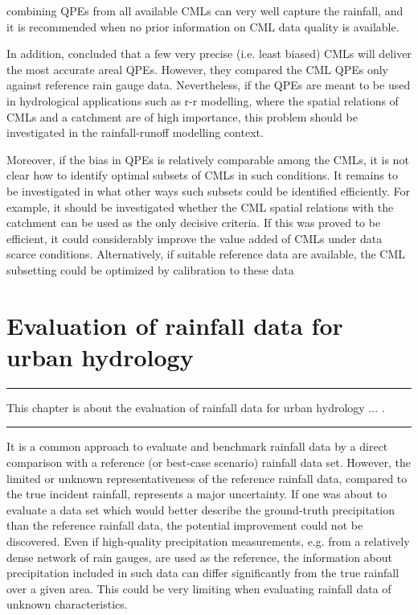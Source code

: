 \documentclass{ctuthesis}\usepackage[]{graphicx}\usepackage[]{color}
\begin{document}
combining QPEs from all available CMLs can very well capture the rainfall, and it is recommended when no prior information on CML data quality is available.

In addition, \cite{fenclCommercialMicrowaveLinks2015} concluded that a few very precise (i.e. least biased) CMLs will deliver the most accurate areal QPEs. However, they compared the CML QPEs only against reference rain gauge data. Nevertheless, if the QPEs are meant to be used in hydrological applications such as r-r modelling, where the spatial relations of CMLs and a catchment are of high importance, this problem should be investigated in the rainfall-runoff modelling context.

Moreover, if the bias in QPEs is relatively comparable among the CMLs, it is not clear how to identify optimal subsets of CMLs in such conditions. It remains to be investigated in what other ways such subsets could be identified efficiently. 
For example, it should be investigated whether the CML spatial relations with the catchment can be used as the only decisive criteria. If this was proved to be efficient, it could considerably improve the value added of CMLs under data scarce conditions.
Alternatively, if suitable reference data are available, the CML subsetting could be optimized by calibration to these data

        


\chapter{Evaluation of rainfall data for urban hydrology} \label{chap2_5}

\rule{\textwidth}{0.4pt}
This chapter is about the evaluation of rainfall data for urban hydrology ... . \newline
\rule[0.2cm]{\textwidth}{0.4pt}

It is a common approach \citep[e.g.][]{fenclCommercialMicrowaveLinks2015, fenclGaugeadjustedRainfallEstimates2017, riosgaonaMeasurementInterpolationUncertainties2015, grafRainfallEstimationGermanwide2020} to evaluate and benchmark rainfall data by a direct comparison with a reference (or best‐case scenario) rainfall data set. However, the limited or unknown representativeness of the reference rainfall data, compared to the true incident rainfall, represents a major uncertainty. If one was about to evaluate a data set which would better describe the ground‐truth precipitation than the reference rainfall data, the potential improvement could not be discovered. Even if high‐quality precipitation measurements, e.g. from a relatively dense network of rain gauges, are used as the reference, the information about precipitation included in such data can differ significantly from the true rainfall over a given area. This could be very limiting when evaluating rainfall data of unknown characteristics.
\end{document}
